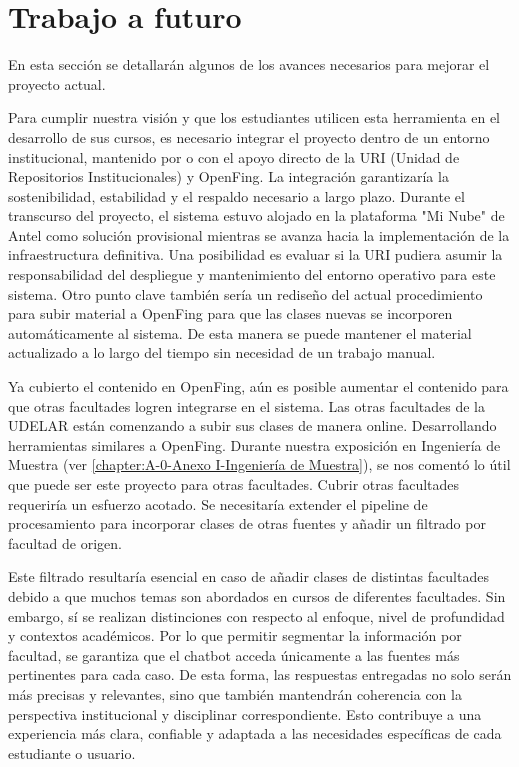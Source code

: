 \chapter{Trabajo a futuro}
\label{chapter:7-Trabajo a futuro}
En esta sección se detallarán algunos de los avances necesarios para mejorar el proyecto actual. 

Para cumplir nuestra visión y que los estudiantes utilicen esta herramienta en el desarrollo de sus cursos, es necesario integrar el proyecto dentro de un entorno institucional, mantenido por o con el apoyo directo de la URI (Unidad de Repositorios Institucionales) y OpenFing. La integración garantizaría la sostenibilidad, estabilidad y el respaldo necesario a largo plazo. Durante el transcurso del proyecto, el sistema estuvo alojado en la plataforma "Mi Nube" de Antel como solución provisional mientras se avanza hacia la implementación de la infraestructura definitiva. Una posibilidad es evaluar si la URI pudiera asumir la responsabilidad del despliegue y mantenimiento del entorno operativo para este sistema. Otro punto clave también sería un rediseño del actual procedimiento para subir material a OpenFing para que las clases nuevas se incorporen automáticamente al sistema. De esta manera se puede mantener el material actualizado a lo largo del tiempo sin necesidad de un trabajo manual. 

Ya cubierto el contenido en OpenFing, aún es posible aumentar el contenido para que otras facultades logren integrarse en el sistema. Las otras facultades de la  UDELAR están comenzando a subir sus clases de manera online. Desarrollando herramientas similares a OpenFing. Durante nuestra exposición en Ingeniería de Muestra (ver \autoref{chapter:A-0-Anexo I-Ingeniería de Muestra}), se nos comentó lo útil que puede ser este proyecto para otras facultades. Cubrir otras facultades requeriría un esfuerzo acotado. Se necesitaría extender el pipeline de procesamiento para incorporar clases de otras fuentes y añadir un filtrado por facultad de origen.

Este filtrado resultaría esencial en caso de añadir clases de distintas facultades debido a que muchos temas son abordados en cursos de diferentes facultades. Sin embargo, sí se realizan distinciones con respecto al enfoque, nivel de profundidad y contextos académicos. Por lo que permitir segmentar la información por facultad, se garantiza que el chatbot acceda únicamente a las fuentes más pertinentes para cada caso. De esta forma, las respuestas entregadas no solo serán más precisas y relevantes, sino que también mantendrán coherencia con la perspectiva institucional y disciplinar correspondiente. Esto contribuye a una experiencia más clara, confiable y adaptada a las necesidades específicas de cada estudiante o usuario.
 
